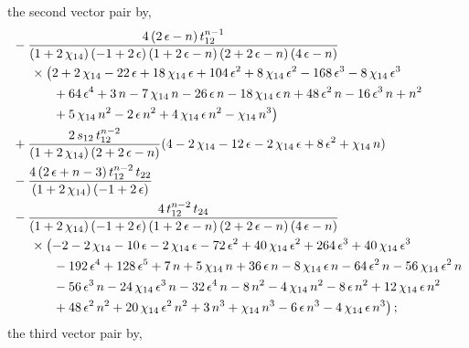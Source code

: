 \documentclass[aps,prd,preprint,groupedaddress,nofootinbib,showpacs,eqsecnum]{revtex4}
\def\eps{\epsilon}
\begin{document}
the second vector pair by,
\begin{equation}
\begin{aligned}
&-\frac{4\,(2\,\eps-n)\,t_{12}^{n-1}}
{(1+2\,\chi_{14})\,(-1+2\,\eps)\,(1+2\,\eps-n)\,(2+2\,\eps-n)\,(4\,\eps-n)}
\\&\indentP\bigl(2+2\,\chi_{14}-22\,\eps+18\,\chi_{14}\,\eps+104\,\eps^{2}
+8\,\chi_{14}\,\eps^{2}-168\,\eps^{3}-8\,\chi_{14}\,\eps^{3}
\\ &\indentPA
+64\,\eps^{4}+3\,n-7\,\chi_{14}\,n-26\,\eps\,n
-18\,\chi_{14}\,\eps\,n+48\,\eps^{2}\,n-16\,\eps^{3}\,n+n^{2}
\\ &\indentPA
+5\,\chi_{14}\,n^{2}-2\,\eps\,n^{2}+4\,\chi_{14}\,\eps\,n^{2}
-\chi_{14}\,n^{3}\bigr)
\\&
+\frac{2\,s_{12}\,t_{12}^{n-2}}{(1+2\,\chi_{14})\,(2+2\,\eps-n)}(4-2\,\chi_{14}-12\,\eps-2\,\chi_{14}\,\eps+8\,\eps^{2}
+\chi_{14}\,n)
\\ &
-\frac{4\,(2\,\eps+n-3)\,t_{12}^{n-2}\,t_{22}}{(1+2\,\chi_{14})\,(-1+2\,\eps)}
\\&-\frac{4\,t_{12}^{n-2}\,t_{24}}
{(1+2\,\chi_{14})\,(-1+2\,\eps)\,(1+2\,\eps-n)\,(2+2\,\eps-n)\,(4\,\eps-n)}
\\&\indentP\bigl(-2-2\,\chi_{14}-10\,\eps-2\,\chi_{14}\,\eps-72\,\eps^{2}
+40\,\chi_{14}\,\eps^{2}+264\,\eps^{3}+40\,\chi_{14}\,\eps^{3}
\\ &\indentPA
-192\,\eps^{4}+128\,\eps^{5}+7\,n+5\,\chi_{14}\,n+36\,\eps\,n
-8\,\chi_{14}\,\eps\,n-64\,\eps^{2}\,n-56\,\chi_{14}\,\eps^{2}\,n
\\ &\indentPA
-56\,\eps^{3}\,n-24\,\chi_{14}\,\eps^{3}\,n-32\,\eps^{4}\,n-8\,n^{2}
-4\,\chi_{14}\,n^{2}-8\,\eps\,n^{2}+12\,\chi_{14}\,\eps\,n^{2}
\\ &\indentPA
+48\,\eps^{2}\,n^{2}+20\,\chi_{14}\,\eps^{2}\,n^{2}+3\,n^{3}
+\chi_{14}\,n^{3}-6\,\eps\,n^{3}-4\,\chi_{14}\,\eps\,n^{3}\bigr)
\,;
\end{aligned}
\end{equation}
the third vector pair by,
\end{document}
